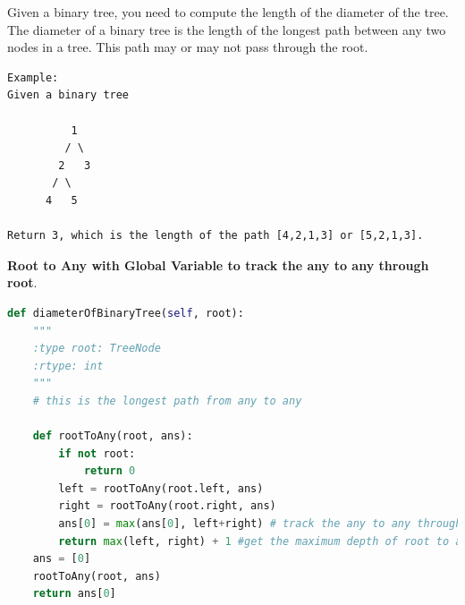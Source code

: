 \documentclass[../main.tex]{subfiles}
\begin{document}
 Given a binary tree, you need to compute the length of the diameter of the tree. The diameter of a binary tree is the length of the longest path between any two nodes in a tree. This path may or may not pass through the root.
\begin{lstlisting}
Example:
Given a binary tree

          1
         / \
        2   3
       / \     
      4   5    

Return 3, which is the length of the path [4,2,1,3] or [5,2,1,3]. 
\end{lstlisting}
\textbf{Root to Any with Global Variable to track the any to any through root}.
\begin{lstlisting}[language=Python]
def diameterOfBinaryTree(self, root):
    """
    :type root: TreeNode
    :rtype: int
    """
    # this is the longest path from any to any
    
    def rootToAny(root, ans):
        if not root:
            return 0
        left = rootToAny(root.left, ans)
        right = rootToAny(root.right, ans)
        ans[0] = max(ans[0], left+right) # track the any to any through root
        return max(left, right) + 1 #get the maximum depth of root to any
    ans = [0]
    rootToAny(root, ans)
    return ans[0]
\end{lstlisting}
\end{document}
